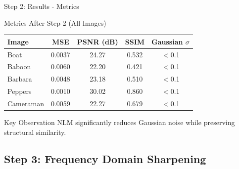 \documentclass[aspectratio=169]{beamer}
\begin{document}
\begin{frame}{Step 2: Results - Metrics}
    \begin{block}{Metrics After Step 2 (All Images)}
        \begin{table}
            \centering
            \begin{tabular}{lcccc}
                \toprule
                \textbf{Image} & \textbf{MSE} & \textbf{PSNR (dB)} & \textbf{SSIM} & \textbf{Gaussian $\sigma$} \\
                \midrule
                Boat & 0.0037 & 24.27 & 0.532 & $<$0.1 \\
                Baboon & 0.0060 & 22.20 & 0.421 & $<$0.1 \\
                Barbara & 0.0048 & 23.18 & 0.510 & $<$0.1 \\
                Peppers & 0.0010 & 30.02 & 0.860 & $<$0.1 \\
                Cameraman & 0.0059 & 22.27 & 0.679 & $<$0.1 \\
                \bottomrule
            \end{tabular}
        \end{table}
    \end{block}
    
    \begin{alertblock}{Key Observation}
        NLM significantly reduces Gaussian noise while preserving structural similarity.
    \end{alertblock}
\end{frame}

\subsection{Step 3: Frequency Domain Sharpening}
\end{document}
